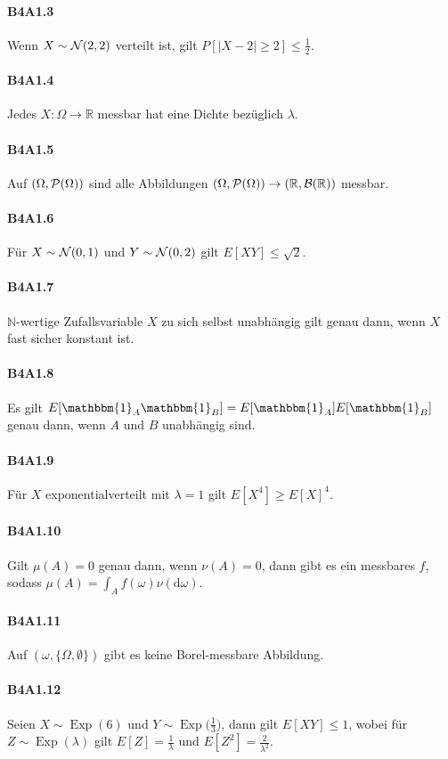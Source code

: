 \documentclass{article}
\begin{document}
\paragraph{B4A1.3}
Wenn $X\sim{\cal N}(2,2)$ verteilt ist, gilt $P[|X-2|\geq2]\leq\frac{1}{2}$.
\paragraph{B4A1.4}
Jedes $X\colon \Omega\to\mathbb{R}$ messbar hat eine Dichte bezüglich $\lambda$.
\paragraph{B4A1.5}
Auf $(\Omega,{\cal P}(\Omega))$ sind alle Abbildungen $(\Omega,{\cal P}(\Omega))\to(\mathbb{R},{\cal B}(\mathbb{R}))$ messbar.
\paragraph{B4A1.6}
Für $X\sim{\cal N}(0,1)$ und $Y\sim{\cal N}(0,2)$ gilt $E[XY]\leq\sqrt{2}$.
\paragraph{B4A1.7}
$\mathbb{N}$-wertige Zufallsvariable $X$ zu sich selbst unabhängig gilt genau dann, wenn $X$ fast sicher konstant ist.
\paragraph{B4A1.8}
Es gilt $E[\mathbbm{1}_A\mathbbm{1}_B]=E[\mathbbm{1}_A]E[\mathbbm{1}_B]$ genau dann, wenn $A$ und $B$ unabhängig sind.
\paragraph{B4A1.9}
Für $X$ exponentialverteilt mit $\lambda=1$ gilt $E[X^4]\geq E[X]^4$.
\paragraph{B4A1.10}
Gilt $\mu(A)=0$ genau dann, wenn $\nu(A)=0$, dann gibt es ein messbares $f$, sodass $\mu(A)=\int_A f(\omega)\nu(\mathrm{d}\omega)$.
\paragraph{B4A1.11}
Auf $(\omega,\{\Omega,\emptyset\})$ gibt es keine Borel-messbare Abbildung.
\paragraph{B4A1.12}
Seien $X\sim\operatorname{Exp}(6)$ und $Y\sim\operatorname{Exp}\bigl(\frac{1}{3}\bigr)$, dann gilt $E[XY]\leq1$, wobei für $Z\sim\operatorname{Exp}(\lambda)$ gilt $E[Z]=\frac{1}{\lambda}$ und $E[Z^2]=\frac{2}{\lambda^2}$.
\end{document}
